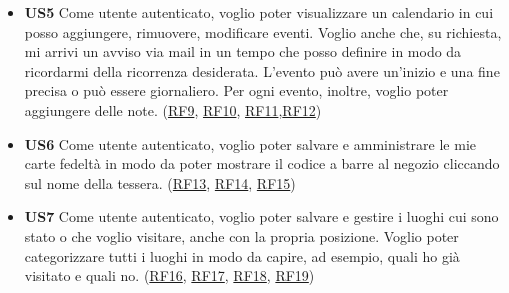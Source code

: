 \documentclass[a4paper,12pt]{article}
\begin{document}
\begin{itemize}
\begin{center}
\end{center}

\newpage

\item \textbf {US5}  Come utente autenticato, voglio poter visualizzare un calendario in cui posso aggiungere, rimuovere, modificare eventi. Voglio anche che, su richiesta, mi arrivi un avviso via mail in un tempo che posso definire in modo da ricordarmi della ricorrenza desiderata. L'evento può avere un'inizio e una fine precisa o può essere giornaliero. Per ogni evento, inoltre, voglio poter aggiungere delle note. (\hyperlink{RF9}{RF9}, \hyperlink{RF10}{RF10}, \hyperlink{RF11}{RF11},\hyperlink{RF12}{RF12})

\begin{center}
\end{center}

\item \textbf {US6} Come utente autenticato, voglio poter salvare e amministrare le mie carte fedeltà in modo da poter mostrare il codice a barre al negozio cliccando sul nome della tessera. (\hyperlink{RF13}{RF13}, \hyperlink{RF14}{RF14}, \hyperlink{RF15}{RF15})

\begin{center}
\end{center}

\item \textbf {US7} Come utente autenticato, voglio poter salvare e gestire i luoghi cui sono stato o che voglio visitare, anche con la propria posizione. Voglio poter categorizzare tutti i luoghi in modo da capire, ad esempio, quali ho già visitato e quali no. (\hyperlink{RF16}{RF16}, \hyperlink{RF17}{RF17}, \hyperlink{RF18}{RF18}, \hyperlink{RF19}{RF19})


\end{itemize}
\end{document}
